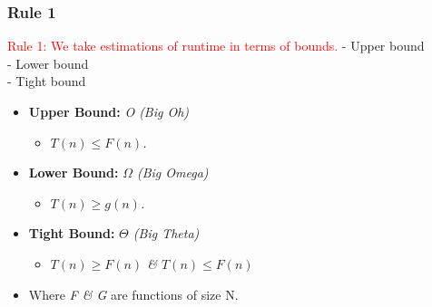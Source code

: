 \begin{frame}
    \frametitle{Rule 1}
      \begin{block}{\textcolor{red}{Rule 1: We take estimations of runtime in terms of bounds.}}
        - Upper bound \\
        - Lower bound \\
        - Tight bound
    \end{block}

    \bigskip %

    \begin{itemize}
        \item \textbf{Upper Bound:} \textit{O (Big Oh)}

        \medskip %

        \begin{itemize}
            \item \textit{$T(n) \leq F(n)$.}
        \end{itemize}

        \vspace{0.2cm}
        \item \textbf{Lower Bound:} \textit{$\Omega$ (Big Omega)}
        \medskip %
         \begin{itemize}
            \item \textit{$T(n) \geq g(n)$.}
        \end{itemize}


          \vspace{0.2cm}
        \item \textbf{Tight Bound:} \textit{$\Theta$ (Big Theta)}
        \medskip %
         \begin{itemize}
            \item \textit{$T(n) \geq F(n)$ \& $T(n) \leq F(n)$}
        \end{itemize}

        \vspace{0.2cm}
        \item Where \textit{F \& G} are functions of size N.
    \end{itemize}

    \bigskip %
\end{frame}


